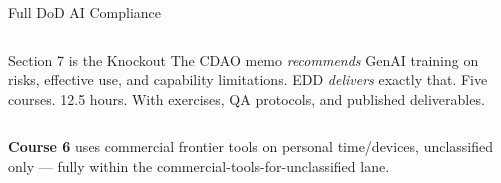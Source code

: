 \documentclass[aspectratio=169,11pt]{beamer}
\newcommand{\navy}[1]{\textbf{\color{navyblue}#1}}
\begin{document}
\begin{frame}[shrink=15]{Full DoD AI Compliance}
\begin{columns}[T]
\vspace{8pt}

\begin{block}{\faCheckCircle\quad Section 7 is the Knockout}
{\small The CDAO memo \emph{recommends} GenAI training on risks, effective use, and capability limitations. EDD \emph{delivers} exactly that. Five courses. 12.5 hours. With exercises, QA protocols, and published deliverables.}
\end{block}

\end{columns}

\vspace{4pt}
{\small\navy{Course 6} uses commercial frontier tools on personal time/devices, unclassified only --- fully within the commercial-tools-for-unclassified lane.}

\end{frame}
\end{document}
